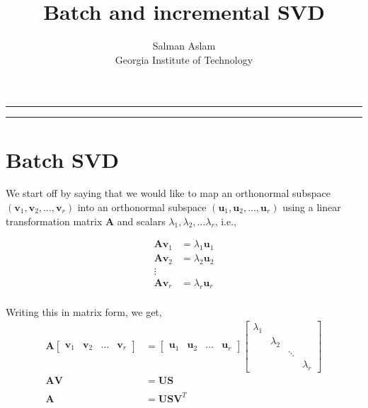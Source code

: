 
\title{Batch and incremental SVD}
\author{Salman Aslam\\ Georgia Institute of Technology}

\maketitle
\rule[0pt]{\textwidth}{1pt}
\tableofcontents
\rule[0pt]{\textwidth}{1pt}

\section{Batch SVD}
We start off by saying that we would like to map an orthonormal subspace $(\mathbf{v}_1, \mathbf{v}_2, \ldots, \mathbf{v}_r)$ into an orthonormal subspace $(\mathbf{u}_1, \mathbf{u}_2, \ldots, \mathbf{u}_r)$ using a linear transformation matrix $\mathbf{A}$ and scalars $\lambda_1, \lambda_2, \ldots \lambda_r$, i.e., 

\begin{equation}
\begin{array}{ll}
\mathbf{A}\mathbf{v}_1 &= \lambda_1 \mathbf{u}_1\\ 
\mathbf{A}\mathbf{v}_2 &= \lambda_2 \mathbf{u}_2\\ 
\vdots\\
\mathbf{A}\mathbf{v}_r &= \lambda_r \mathbf{u}_r\\ 
\end{array}
\end{equation}

Writing this in matrix form, we get,
\begin{equation}
\begin{array}{ll}
\mathbf{A}\left[\begin{array}{cccc}\mathbf{v}_1 & \mathbf{v}_2 &\ldots &\mathbf{v}_r\end{array}\right] &=\left[\begin{array}{cccc}\mathbf{u}_1 & \mathbf{u}_2 &\ldots & \mathbf{u}_r\end{array}\right]\left[\begin{array}{cccc}\lambda_1 &  & & \\& \lambda_2 & & \\& & \ddots &  \\& & & \lambda_r\end{array}\right]\\
\mathbf{A}\mathbf{V} &=\mathbf{U} \mathbf{S}\\ \\
\mathbf{A} &=\mathbf{U} \mathbf{S} \mathbf{V}^T \\
\end{array}
\end{equation}

